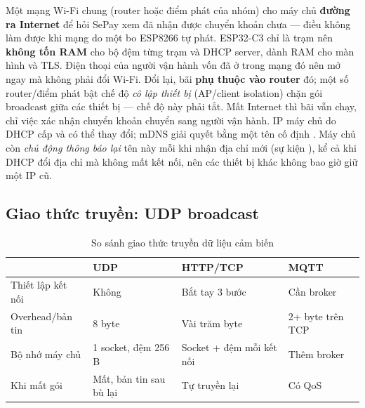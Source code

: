 \begin{lydo}
Một mạng Wi-Fi chung (router hoặc điểm phát của nhóm) cho máy chủ \textbf{đường ra
Internet} để hỏi SePay xem đã nhận được chuyển khoản chưa — điều không làm được khi
mạng do một bo ESP8266 tự phát. ESP32-C3 chỉ là trạm nên \textbf{không tốn RAM} cho bộ
đệm từng trạm và DHCP server, dành RAM cho màn hình và TLS. Điện thoại của người vận
hành vốn đã ở trong mạng đó nên mở  ngay mà không phải đổi Wi-Fi.
Đổi lại, bãi \textbf{phụ thuộc vào router} đó; một số router/điểm phát bật chế độ
\emph{cô lập thiết bị} (AP/client isolation) chặn gói broadcast giữa các thiết bị — chế độ
này phải tắt. Mất Internet thì bãi vẫn chạy, chỉ việc xác nhận chuyển khoản chuyển sang
người vận hành. IP máy chủ do DHCP cấp và có thể thay đổi; mDNS giải quyết bằng một
tên cố định . Máy chủ còn \emph{chủ động thông báo lại} tên này mỗi
khi nhận địa chỉ mới (sự kiện ), kể cả khi DHCP đổi địa chỉ
mà không mất kết nối, nên các thiết bị khác không bao giờ giữ một IP cũ.
\end{lydo}

\subsection{Giao thức truyền: UDP broadcast}
\begin{table}[H]
\centering\small
\caption{So sánh giao thức truyền dữ liệu cảm biến}\label{tab:proto}
\begin{tabularx}{\linewidth}{@{}lXXX@{}}
\toprule
& \textbf{UDP} & \textbf{HTTP/TCP} & \textbf{MQTT} \\ \midrule
Thiết lập kết nối & Không & Bắt tay 3 bước & Cần broker \\
Overhead/bản tin & 8 byte & Vài trăm byte & 2+ byte trên TCP \\
Bộ nhớ máy chủ & 1 socket, đệm 256\,B & Socket + đệm mỗi kết nối & Thêm broker \\
Khi mất gói & Mất, bản tin sau bù lại & Tự truyền lại & Có QoS \\
\bottomrule
\end{tabularx}
\end{table}

